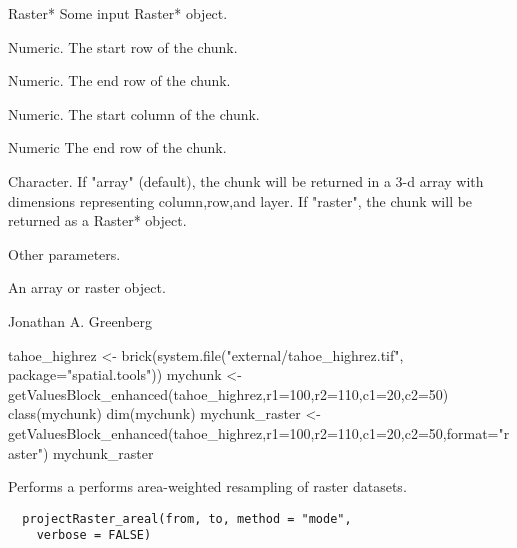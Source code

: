 \documentclass[a4paper]{book}
\begin{document}
%
\begin{Arguments}
\begin{ldescription}
\item[\code{x}] Raster* Some input Raster* object.

\item[\code{r1}] Numeric. The start row of the chunk.

\item[\code{r2}] Numeric. The end row of the chunk.

\item[\code{c1}] Numeric. The start column of the chunk.

\item[\code{c2}] Numeric The end row of the chunk.

\item[\code{format}] Character. If "array" (default), the chunk
will be returned in a 3-d array with dimensions
representing column,row,and layer.  If "raster", the
chunk will be returned as a Raster* object.

\item[\code{...}] Other parameters.
\end{ldescription}
\end{Arguments}
%
\begin{Value}
An array or raster object.
\end{Value}
%
\begin{Author}\relax
Jonathan A. Greenberg
\end{Author}
%
\begin{SeeAlso}\relax
{}
\end{SeeAlso}
%
\begin{Examples}
\begin{ExampleCode}
tahoe_highrez <- brick(system.file("external/tahoe_highrez.tif", package="spatial.tools"))
mychunk <- getValuesBlock_enhanced(tahoe_highrez,r1=100,r2=110,c1=20,c2=50)
class(mychunk)
dim(mychunk)
mychunk_raster <- getValuesBlock_enhanced(tahoe_highrez,r1=100,r2=110,c1=20,c2=50,format="raster")
mychunk_raster
\end{ExampleCode}
\end{Examples}
%
\begin{Description}\relax
Performs a performs area-weighted resampling of raster
datasets.
\end{Description}
%
\begin{Usage}
\begin{verbatim}
  projectRaster_areal(from, to, method = "mode",
    verbose = FALSE)
\end{verbatim}
\end{Usage}
\end{document}
